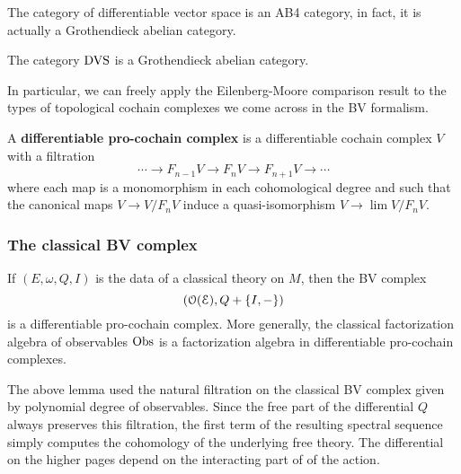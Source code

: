\documentclass[10pt, oneside]{article}
\begin{document}
The category of differentiable vector space is an AB4 category, in fact, it is actually a Grothendieck abelian category. 

\begin{thm}
The category ${\rm DVS}$ is a Grothendieck abelian category.
\end{thm}

In particular, we can freely apply the Eilenberg-Moore comparison result to the types of topological cochain complexes we come across in the BV formalism. 

\begin{definition}\label{dfn: pro}
A {\bf differentiable pro-cochain complex} is a differentiable cochain complex $V$ with a filtration
\[
\cdots \to F_{n-1} V \to F_{n} V \to F_{n+1}V \to \cdots
\]
where each map is a monomorphism in each cohomological degree and such that the canonical maps $V \to V / F_n V$ induce a quasi-isomorphism $V \to \lim V / F_n V$. 
\end{definition}

\subsubsection{The classical BV complex}

\begin{lem}
If $(E, \omega, Q, I)$ is the data of a classical theory on $M$, then the BV complex
\[
\left(\mathcal O(\mathcal E) , Q + \{I,-\}\right)
\]
is a differentiable pro-cochain complex.
More generally, the classical factorization algebra of observables $\mathrm{Obs}$ is a factorization algebra in differentiable pro-cochain complexes. 
\end{lem}

The above lemma used the natural filtration on the classical BV complex given by polynomial degree of observables. 
Since the free part of the differential $Q$ always preserves this filtration, the first term of the resulting spectral sequence simply computes the cohomology of the underlying free theory. 
The differential on the higher pages depend on the interacting part of of the action. 
\end{document}
